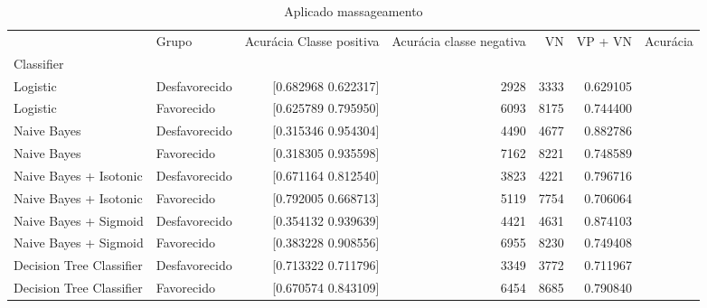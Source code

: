         \begin{table}
            \centering
            \caption{Aplicado massageamento}
            \label{Aplicado massageamento 4}
            \begin{tabular}{llrrrrr}
            \toprule
            {} &          Grupo &  Acurácia Classe positiva &  Acurácia classe negativa &   VN  &  VP + VN  &  Acurácia \\
            Classifier               &                &                           &                           &       &           &           \\
            \midrule
            Logistic                 &  Desfavorecido &                  [0.682968  0.622317] &  2928 &      3333 &  0.629105 \\
            Logistic                 &     Favorecido &                  [0.625789  0.795950] &  6093 &      8175 &  0.744400 \\
            Naive Bayes              &  Desfavorecido &                  [0.315346  0.954304] &  4490 &      4677 &  0.882786 \\
            Naive Bayes              &     Favorecido &                  [0.318305  0.935598] &  7162 &      8221 &  0.748589 \\
            Naive Bayes + Isotonic   &  Desfavorecido &                  [0.671164  0.812540] &  3823 &      4221 &  0.796716 \\
            Naive Bayes + Isotonic   &     Favorecido &                  [0.792005  0.668713] &  5119 &      7754 &  0.706064 \\
            Naive Bayes + Sigmoid    &  Desfavorecido &                  [0.354132  0.939639] &  4421 &      4631 &  0.874103 \\
            Naive Bayes + Sigmoid    &     Favorecido &                  [0.383228  0.908556] &  6955 &      8230 &  0.749408 \\
            Decision Tree Classifier &  Desfavorecido &                  [0.713322  0.711796] &  3349 &      3772 &  0.711967 \\
            Decision Tree Classifier &     Favorecido &                  [0.670574  0.843109] &  6454 &      8685 &  0.790840 \\
            \bottomrule
            \end{tabular}
        \end{table}
